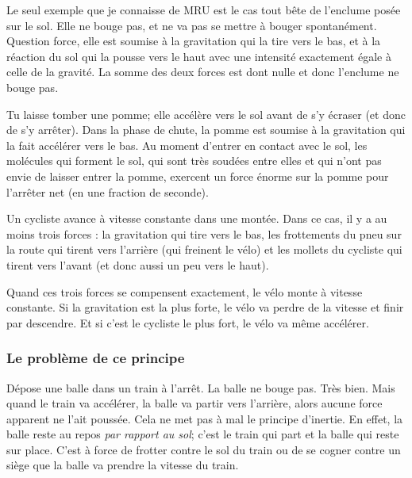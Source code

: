 \begin{exemple}
Le seul exemple que je connaisse de MRU est le cas tout bête de l'enclume posée sur le sol. Elle ne bouge pas, et ne va pas se mettre à bouger spontanément. Question force, elle est soumise à la gravitation qui la tire vers le bas, et à la réaction du sol qui la pousse vers le haut avec une intensité exactement égale à celle de la gravité. La somme des deux forces est dont nulle et donc l'enclume ne bouge pas.
\end{exemple}


\begin{exemple}
Tu laisse tomber une pomme; elle accélère vers le sol avant de s'y écraser (et donc de s'y arrêter). Dans la phase de chute, la pomme est soumise à la gravitation qui la fait accélérer vers le bas. Au moment d'entrer en contact avec le sol, les molécules qui forment le sol, qui sont très soudées entre elles et qui n'ont pas envie de laisser entrer la pomme, exercent un force énorme sur la pomme pour l'arrêter net (en une fraction de seconde).
\end{exemple}

\begin{exemple}
Un cycliste avance à vitesse constante dans une montée. Dans ce cas, il y a au moins trois forces : la gravitation qui tire vers le bas, les frottements du pneu sur la route qui tirent vers l'arrière (qui freinent le vélo) et les mollets du cycliste qui tirent vers l'avant (et donc aussi un peu vers le haut).

 Quand ces trois forces se compensent exactement, le vélo monte à vitesse constante. Si la gravitation est la plus forte, le vélo va perdre de la vitesse et finir par descendre. Et si c'est le cycliste le plus fort, le vélo va même accélérer.
\end{exemple}


\subsubsection{Le problème de ce principe}


Dépose une balle dans un train à l'arrêt. La balle ne bouge pas. Très bien. Mais quand le train va accélérer, la balle va partir vers l'arrière, alors aucune force apparent ne l'ait poussée. Cela ne met pas à mal le principe d'inertie. En effet, la balle reste au repos \emph{par rapport au sol}; c'est le train qui part et la balle qui reste sur place. C'est à force de frotter contre le sol du train ou de se cogner contre un siège que la balle va prendre la vitesse du train.


